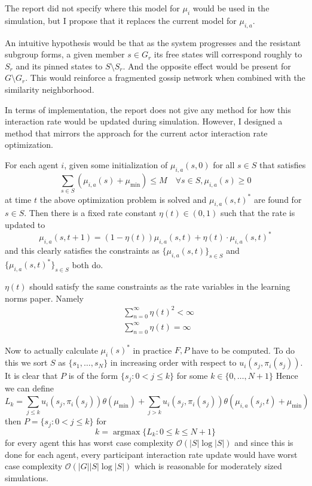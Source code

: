 \documentclass[12pt]{article}
\begin{document}
The report did not specify where this model for $\mu_i$ would be used in the simulation, but I propose
that it replaces the current model for $\mu_{i, a}$.

An intuitive hypothesis would be that as the system progresses and the resistant subgroup
forms, a given member $s \in G_r$ its free states will correspond roughly to $S_r$
and its pinned states to $S \setminus S_r$. And the opposite effect would be present for $G \setminus G_r$.
This would reinforce a fragmented gossip network when combined with the similarity neighborhood.

In terms of implementation, the report does not give any method for how this interaction rate would
be updated during simulation. However, I designed a method that mirrors the approach for the current actor interaction
rate optimization.

For each agent $i$, given some initialization of $\mu_{i, a}(s, 0)$ for all $s \in S$ that satisfies
\[ \sum_{s \in S}(\mu_{i, a}(s) + \mu_{\text{min}}) \leq M \quad \forall s \in S, \mu_{i, a}(s) \geq 0  \]
at time $t$ the above optimization problem is solved and $\mu_{i, a}(s, t)^*$ are found for $s \in S$.
Then there is a fixed rate constant $\eta(t) \in (0, 1)$ such that the rate is updated to
\[ \mu_{i, a}(s, t+1) = (1 - \eta(t))\mu_{i, a}(s, t) + \eta(t) \cdot \mu_{i,a}(s, t)^* \]
and this clearly satisfies the constraints as $\{ \mu_{i, a}(s, t) \}_{s \in S}$ and $\{ \mu_{i, a}(s, t)^* \}_{s \in S}$
both do.

$\eta(t)$ should satisfy the same constraints as the rate variables in the learning norms paper. Namely
\begin{align*}
    &\sum_{n = 0}^\infty \eta(t)^2 < \infty \\
    &\sum_{n = 0}^\infty \eta(t) = \infty
\end{align*}

Now to actually calculate $\mu_i(s)^*$ in practice $F, P$ have to be computed.
To do this we sort $S$ as $\{ s_1, \ldots, s_N \}$ in increasing order with respect to $u_i(s_j, \pi_i(s_j))$.
It is clear that $P$ is of the form $\{ s_j : 0 < j \leq k \}$ for some $k \in \{ 0, \ldots, N + 1 \}$
Hence we can define
\[ L_k = \sum_{j \leq k}u_i(s_j, \pi_i(s_j))\theta(\mu_{\text{min}}) + \sum_{j > k}u_i(s_j, \pi_i(s_j))\theta(\mu_{i, a}(s_j, t) + \mu_{\text{min}}) \]
then $P = \{ s_j : 0 < j \leq k \}$ for
\[ k = \operatorname{argmax} \{ L_k : 0 \leq k \leq N + 1 \} \]
for every agent this has worst case complexity $\mathcal O(|S|\log |S|)$
and since this is done for each agent, every participant interaction rate update would have worst case complexity
$\mathcal O(|G||S|\log |S|)$ which is reasonable for moderately sized simulations.
\end{document}
